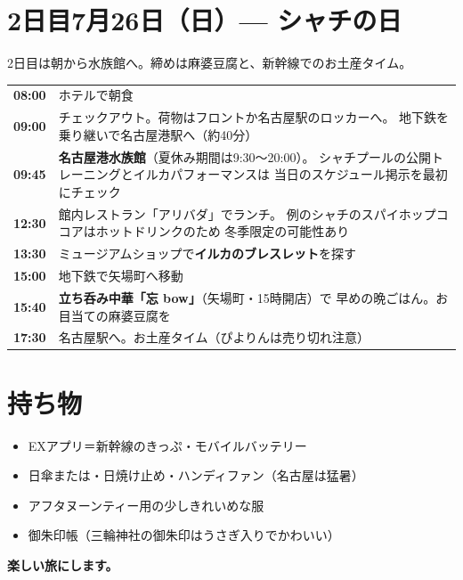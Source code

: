 \documentclass[a4paper,12pt]{article}
\theoremstyle{definition}
\theoremstyle{remark}
\newcommand{\slot}[2]{\textbf{#1} & #2 \\}
\begin{document}
\section*{2日目7月26日（日）--- シャチの日}

2日目は朝から水族館へ。締めは麻婆豆腐と、新幹線でのお土産タイム。

\begin{center}
	\begin{tabular}{p{7.5em}p{27em}}
		\toprule
		\slot{08:00}{ホテルで朝食}
		\slot{09:00}{チェックアウト。荷物はフロントか名古屋駅のロッカーへ。
			地下鉄を乗り継いで名古屋港駅へ（約40分）}
		\slot{09:45}{\textbf{名古屋港水族館}（夏休み期間は9:30〜20:00）。
			シャチプールの公開トレーニングとイルカパフォーマンスは
			当日のスケジュール掲示を最初にチェック}
		\slot{12:30}{館内レストラン「アリバダ」でランチ。
			例のシャチのスパイホップココアはホットドリンクのため
			冬季限定の可能性あり}
		\slot{13:30}{ミュージアムショップで\textbf{イルカのブレスレット}を探す}
		\slot{15:00}{地下鉄で矢場町へ移動}
		\slot{15:40}{\textbf{立ち呑み中華「忘 bow」}（矢場町・15時開店）で
			早めの晩ごはん。お目当ての麻婆豆腐を}
		\slot{17:30}{名古屋駅へ。お土産タイム（ぴよりんは売り切れ注意）}
		\bottomrule
	\end{tabular}
\end{center}

\section*{持ち物}

\begin{itemize}[leftmargin=1.5em, itemsep=0.1em]
	\item EXアプリ＝新幹線のきっぷ・モバイルバッテリー
	\item 日傘または・日焼け止め・ハンディファン（名古屋は猛暑）
	\item アフタヌーンティー用の少しきれいめな服
	\item 御朱印帳（三輪神社の御朱印はうさぎ入りでかわいい）
\end{itemize}

\begin{center}
	{\sffamily\bfseries\color{nagoyagold} 楽しい旅にします。}
\end{center}
\end{document}
